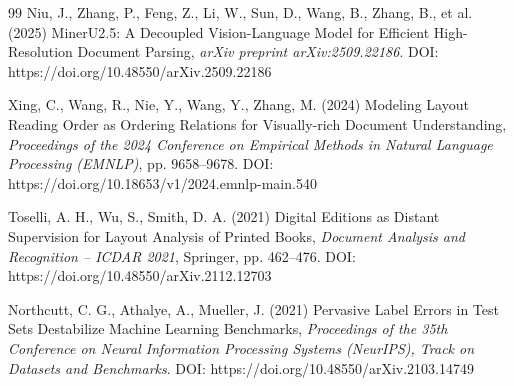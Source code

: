 \documentclass[11pt,twoside]{article}
\begin{document}
\begin{thebibliography}{99}
   Niu, J., Zhang, P., Feng, Z., Li, W., Sun, D., Wang, B.,
  Zhang, B., et al. (2025) MinerU2.5: A Decoupled Vision-Language Model for
  Efficient High-Resolution Document Parsing,
  {\it arXiv preprint arXiv:2509.22186}.
  DOI: https://doi.org/10.48550/arXiv.2509.22186

   Xing, C., Wang, R., Nie, Y., Wang, Y., Zhang, M. (2024)
  Modeling Layout Reading Order as Ordering Relations for Visually-rich Document
  Understanding, {\it Proceedings of the 2024 Conference on Empirical Methods in
  Natural Language Processing (EMNLP)}, pp. 9658--9678.
  DOI: https://doi.org/10.18653/v1/2024.emnlp-main.540

   Toselli, A. H., Wu, S., Smith, D. A. (2021) Digital Editions
  as Distant Supervision for Layout Analysis of Printed Books,
  {\it Document Analysis and Recognition -- ICDAR 2021}, Springer, pp. 462--476.
  DOI: https://doi.org/10.48550/arXiv.2112.12703

   Northcutt, C. G., Athalye, A., Mueller, J. (2021)
  Pervasive Label Errors in Test Sets Destabilize Machine Learning Benchmarks,
  {\it Proceedings of the 35th Conference on Neural Information Processing
  Systems (NeurIPS), Track on Datasets and Benchmarks}.
  DOI: https://doi.org/10.48550/arXiv.2103.14749

\end{thebibliography}
\end{document}
